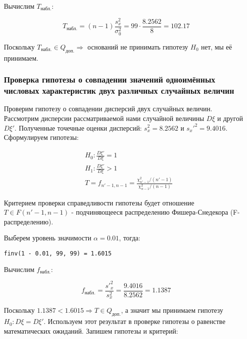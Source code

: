 \documentclass{report}
\begin{document}
Вычислим $T_{\text{набл.}}$:

\begin{equation}
T_{\text{набл.}} = \left(n - 1\right)\frac{s^2_x}{\sigma^2_0} = 99 \cdot \frac{8.2562}{8} = 102.17
\end{equation}

Поскольку $T_{\text{набл.}} \in Q_{\text{доп.}} \Rightarrow$ оснований не принимать гипотезу $H_0$ нет, мы её принимаем.

\newpage

\subsubsection*{Проверка гипотезы о совпадении значений одноимённых числовых характеристик двух различных случайных величин}

Проверим гипотезу о совпадении дисперсий двух случайных величин.
Рассмотрим дисперсии рассматриваемой нами случайной величины $D\xi$ и другой $D\xi'$. Полученные точечные оценки дисперсий: $s_x^2 = 8.2562$ и $s_x'^2 = 9.4016$. Сформулируем гипотезы:

\begin{equation*}
\begin{split}
& H_0 : \frac{D\xi'}{D\xi} = 1 \\
& H_1 : \frac{D\xi'}{D\xi} > 1 \\
& T = f_{n'-1, n-1} = \frac{\chi^2_{n'-1} / (n' - 1)}{\chi^2_{n - 1} / (n - 1)}
\end{split}
\end{equation*}

Критерием проверки справедливости гипотезы будет отношение $T \in F(n' - 1, n - 1)$ - подчиняющееся распределению Фишера-Снедекора (F-распределению).

Выберем уровень значимости $\alpha = 0.01$, тогда:

\begin{lstlisting}
finv(1 - 0.01, 99, 99) = 1.6015
\end{lstlisting}

Вычислим $f_{\text{набл.}}$:

\begin{equation}
f_{\text{набл.}} = \frac{s'^2_x}{s^2_x} = \frac{9.4016}{8.2562}= 1.1387
\end{equation}

Поскольку $1.1387 < 1.6015 \Rightarrow T \in Q_{\text{доп.}}$, а значит мы принимаем гипотезу $H_0 : D\xi = D\xi'$.
Используем этот результат в проверке гипотезы о равенстве математических ожиданий.
Запишем гипотезы и критерий:
\end{document}
